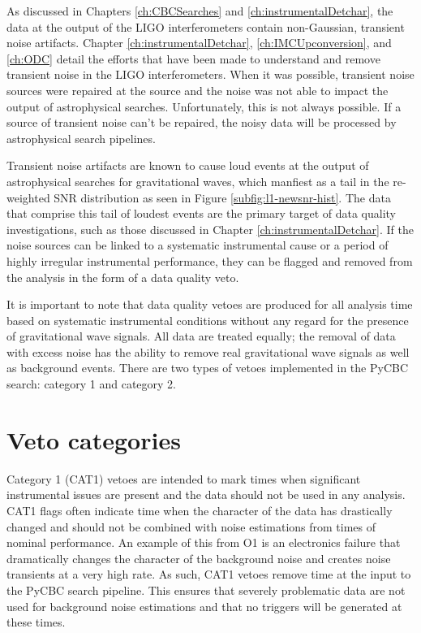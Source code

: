 As discussed in Chapters \ref{ch:CBCSearches} and \ref{ch:instrumentalDetchar}, the data at the 
output of the LIGO interferometers contain non-Gaussian, transient noise artifacts. 
Chapter \ref{ch:instrumentalDetchar}, \ref{ch:IMCUpconversion}, and \ref{ch:ODC} detail the efforts 
that have been made to understand and remove transient noise in the LIGO interferometers. 
When it was possible, transient noise sources were repaired at the source and the noise was not 
able to impact the output of astrophysical searches. Unfortunately, this is not always possible. 
If a source of transient noise can't be repaired, the noisy data will be processed by astrophysical
search pipelines. 

Transient noise artifacts are 
known to cause loud events at the output of astrophysical searches for gravitational waves, which 
manfiest as a tail in the re-weighted SNR distribution as seen in Figure \ref{subfig:l1-newsnr-hist}. 
The data that comprise this tail of loudest events are the primary target of data quality 
investigations, such as those discussed in Chapter \ref{ch:instrumentalDetchar}. 
If the noise sources can be linked to a 
systematic instrumental cause or a period of highly irregular instrumental performance, 
they can be flagged and removed from the analysis in the form of a 
data quality veto.

It is important to note that data quality vetoes are produced for all analysis time based
on systematic instrumental conditions without any regard for the presence of gravitational wave
signals. All data are treated equally; the removal of data with excess noise has the ability to
remove real gravitational wave signals as well as background events.
There are two types of vetoes implemented in the PyCBC search: category 1 and
category 2.

\section{Veto categories}

Category 1 (CAT1) vetoes are intended to mark times when significant instrumental issues are present
and the data should not be used in any analysis. CAT1 flags often indicate time
when the character of the data has drastically changed and should not be combined
with noise estimations from times of nominal performance.
An example of this from O1 is an electronics failure that dramatically changes the character of the
background noise and creates noise transients at a very high rate.
As such, CAT1 vetoes remove time at the input to the PyCBC search pipeline. This ensures that
severely problematic data are not used for background noise estimations and that no triggers will be
generated at these times.

